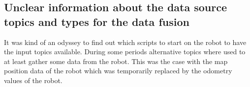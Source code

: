 \subsection{Unclear information about the data source topics and types for the data fusion}
It was kind of an odyssey to find out which scripts to start on the robot to have the input topics available. During some periods alternative topics where used to at least gather some data from the robot. This was the case with the map position data of the robot which was temporarily replaced by the odometry values of the robot.